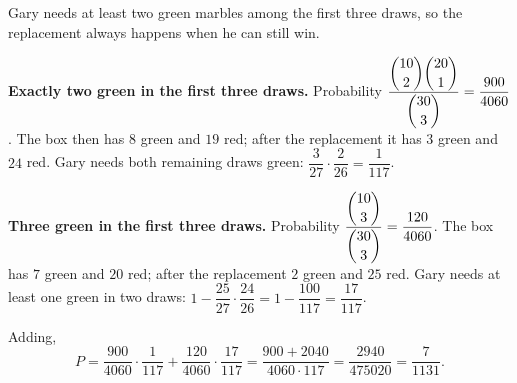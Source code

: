 Gary needs at least two green marbles among the first three draws, so the replacement always happens when he can still win.

\textbf{Exactly two green in the first three draws.} Probability $\dfrac{\dbinom{10}{2}\dbinom{20}{1}}{\dbinom{30}{3}}=\dfrac{900}{4060}$. The box then has $8$ green and $19$ red; after the replacement it has $3$ green and $24$ red. Gary needs both remaining draws green: $\dfrac{3}{27}\cdot\dfrac{2}{26}=\dfrac{1}{117}$.

\textbf{Three green in the first three draws.} Probability $\dfrac{\dbinom{10}{3}}{\dbinom{30}{3}}=\dfrac{120}{4060}$. The box has $7$ green and $20$ red; after the replacement $2$ green and $25$ red. Gary needs at least one green in two draws: $1-\dfrac{25}{27}\cdot\dfrac{24}{26}=1-\dfrac{100}{117}=\dfrac{17}{117}$.

Adding,
\[
P=\dfrac{900}{4060}\cdot\dfrac{1}{117}+\dfrac{120}{4060}\cdot\dfrac{17}{117}=\dfrac{900+2040}{4060\cdot117}=\dfrac{2940}{475020}=\boxed{\dfrac{7}{1131}}.
\]
